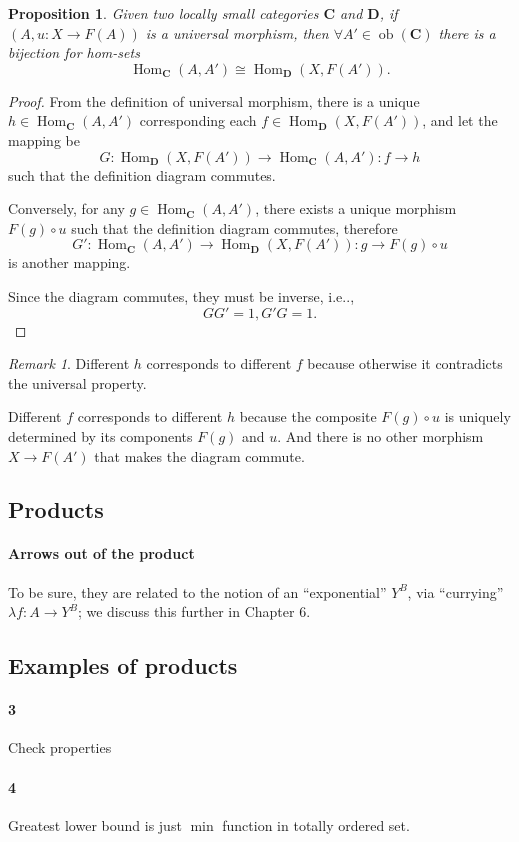 \documentclass[12pt, letterpaper]{article}
\makeatletter
\newcommand{\ob}{\operatorname{ob}}
\newcommand{\Hom}{\operatorname{Hom}}
\newcommand{\bfC}{\mathbf{C}}
\newcommand{\bfD}{\mathbf{D}}
\newcommand\ie{i.e\@ifnextchar.{}{.\@}}
\newcommand{\red}[1]{{\color{red} #1}}
\newtheorem{prop}{Proposition}[section]
\theoremstyle{definition}
\theoremstyle{remark}
\newtheorem*{rem*}{Remark}
\theoremstyle{definition}
\theoremstyle{plain}
\numberwithin{equation}{section}
\makeatother
\begin{document}
	\begin{prop}
		Given two locally small categories $\bfC$ and $\bfD$,
		if $(A,u\colon X\to F(A))$ is a universal morphism,
		then $\forall A'\in \ob(\bfC)$ there is a bijection for hom-sets
		\[ \Hom_\bfC(A,A')\cong \Hom_\bfD(X,F(A')). \]
	\end{prop}
	\begin{proof}
		From the definition of universal morphism,
		there is a unique $h\in \Hom_\bfC(A,A')$ corresponding
		each $f\in \Hom_\bfD(X,F(A'))$, and let the mapping be
		\[ G\colon\Hom_\bfD(X,F(A'))\to  \Hom_\bfC(A,A')\colon f\to h  \]
		such that the definition diagram commutes.
		
		Conversely, for any $g\in \Hom_\bfC(A,A')$, there exists a unique
		morphism $ F(g) \circ u $ such that the definition diagram commutes,
		therefore
		\[ G'\colon\Hom_\bfC(A,A')\to  \Hom_\bfD(X,F(A')) \colon g\to F(g) \circ u   \]
		is another mapping.
		
		Since the diagram commutes, they must be inverse, \ie,
		\[ GG'=1, G'G=1. \]
	\end{proof}
	\begin{rem*}
		Different $h$ corresponds to different $f$
		because otherwise it contradicts the universal property.
		
		Different $f$ corresponds to different $h$
		because the composite $F(g)\circ u$ is uniquely determined by its components $F(g)$ and $u$.
		And there is no other morphism $X\to F(A')$ that makes the diagram commute.
	\end{rem*}
	
	
	\subsection{Products}
	\paragraph{Arrows out of the product}
	\red{To be sure, they are related to the notion of an
	``exponential'' $Y^B$, via ``currying'' $\lambda f : A \to Y^B$; we discuss this further in
	Chapter 6.}
	\subsection{Examples of products}
	\paragraph{3}
	\red{Check properties}
	\paragraph{4}
	Greatest lower bound is just $\min$ function in totally ordered set.
	
\end{document}
